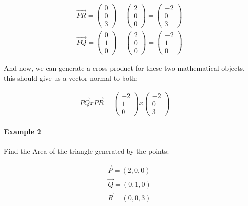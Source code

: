 \documentclass[11pt,fleqn]{book} %
\begin{document}
\begin{gather}
    \vec{PR} = \begin{pmatrix}
        0\\0\\3
    \end{pmatrix} - \begin{pmatrix}
        2\\0\\0
    \end{pmatrix} = \begin{pmatrix}
        -2\\0\\3
    \end{pmatrix}\\
    \vec{PQ} = \begin{pmatrix}
        0\\1\\0
    \end{pmatrix} - \begin{pmatrix}
        2\\0\\0
    \end{pmatrix} = \begin{pmatrix}
        -2\\1\\0
    \end{pmatrix}
\end{gather}

And now, we can generate a cross product for these two mathematical objects, this should give us a vector normal to both:

\begin{gather}
    \vec{PQ} x \vec{PR} = \begin{pmatrix}
        -2\\1\\0
    \end{pmatrix} x \begin{pmatrix}
        -2\\0\\3
    \end{pmatrix} = 
\end{gather}

\paragraph{Example 2}

Find the Area of the triangle generated by the points:

\begin{gather}
    \vec{P} = (2,0,0) \\
    \vec{Q} = (0,1,0) \\
    \vec{R} = (0,0,3)
\end{gather}
\end{document}
